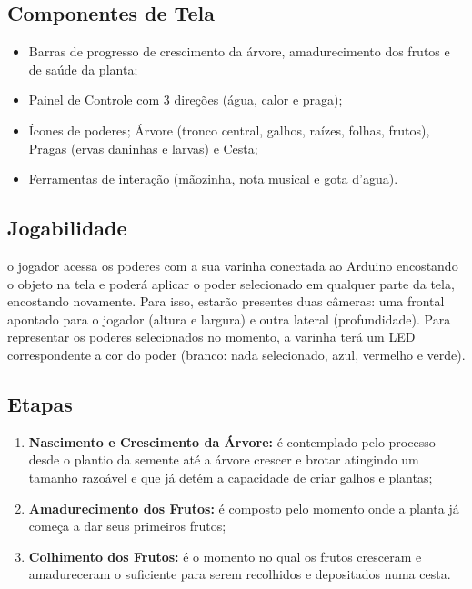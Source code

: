 \documentclass[12pt]{article}
\begin{document}
\subsection{Componentes de Tela}
\begin{itemize}
\item Barras de progresso de crescimento da \'arvore, amadurecimento dos frutos e de sa\'ude da planta;
\item Painel de Controle com 3 dire\c c\~oes (\'agua, calor e praga);
\item \'Icones de poderes; \'Arvore (tronco central, galhos, ra\'izes, folhas, frutos), Pragas (ervas daninhas e larvas) e Cesta;
\item Ferramentas de intera\c c\~ao (m\~aozinha, nota musical e gota d'agua).
\end{itemize}

\subsection{Jogabilidade}
o jogador acessa os poderes com a sua varinha conectada ao Arduino encostando
o objeto na tela e poder\'a aplicar o poder selecionado em qualquer parte da tela,
encostando novamente. Para isso, estar\~ao presentes duas c\^ameras: uma frontal
apontado para o jogador (altura e largura) e outra lateral (profundidade).
Para representar os poderes selecionados no momento, a varinha ter\'a um LED
correspondente a cor do poder (branco: nada selecionado, azul, vermelho e verde).

\subsection{Etapas}
\begin{enumerate}
\item \textbf{Nascimento e Crescimento da \'Arvore:} \'e contemplado pelo processo desde o plantio
 da semente at\'e a \'arvore crescer e brotar atingindo um tamanho razo\'avel e que j\'a det\'em a
 capacidade de criar galhos e plantas;
\item \textbf{Amadurecimento dos Frutos:} \'e composto pelo momento onde a planta j\'a
 come\c ca a dar seus primeiros frutos;
\item \textbf{Colhimento dos Frutos:} \'e o momento no qual os frutos cresceram e amadureceram
 o suficiente para serem recolhidos e depositados numa cesta.
\end{enumerate}
\end{document}
